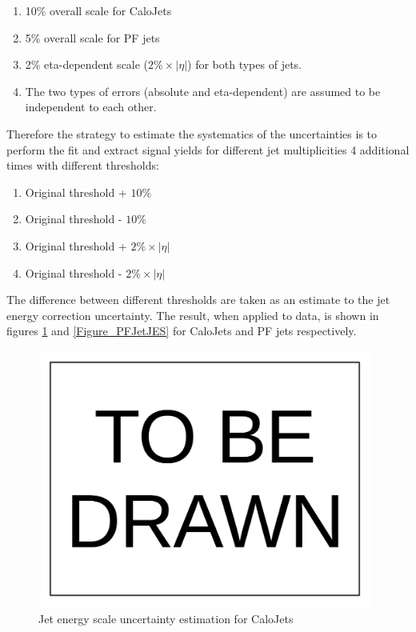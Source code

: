 \documentclass[10pt,a4paper,onecolumn]{article}
\begin{document}
\begin{enumerate}
\item 10\% overall scale for CaloJets
\item 5\% overall scale for PF jets
\item 2\% eta-dependent scale ($2\% \times |\eta|$) for both types of jets.
\item The two types of errors (absolute and eta-dependent) are assumed to be independent to each other.
\end{enumerate}

Therefore the strategy to estimate the systematics of the uncertainties is to perform the fit and extract signal yields for different jet multiplicities 4 additional times with different thresholds:

\begin{enumerate}
\item Original threshold + $10\%$
\item Original threshold - $10\%$
\item Original threshold + $2\% \times |\eta|$
\item Original threshold - $2\% \times |\eta|$
\end{enumerate}

The difference between different thresholds are taken as an estimate to the jet energy correction uncertainty.
The result, when applied to data, is shown in figures \ref{Figure_CaloJetJES} and \ref{Figure_PFJetJES} for CaloJets and PF jets respectively.

\begin{figure}
\includegraphics[width=110mm]{ToBeDrawn.pdf}
\caption{Jet energy scale uncertainty estimation for CaloJets}
\label{Figure_CaloJetJES}
\end{figure}
\end{document}

